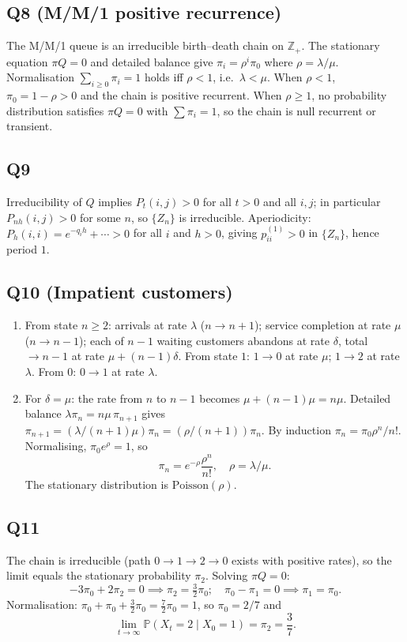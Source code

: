 \documentclass[11pt]{article}
\newcommand{\PP}{\mathbb{P}}
\newcommand{\1}{\mathbf{1}}
\begin{document}
\subsection*{Q8 (M/M/1 positive recurrence)}
The M/M/1 queue is an irreducible birth--death chain on $\mathbb{Z}_+$.  The stationary equation $\pi Q=0$ and detailed balance give $\pi_i=\rho^i\pi_0$ where $\rho=\lambda/\mu$.  Normalisation $\sum_{i\ge0}\pi_i=1$ holds iff $\rho<1$, i.e.\ $\lambda<\mu$.  When $\rho<1$, $\pi_0=1-\rho>0$ and the chain is positive recurrent.  When $\rho\ge1$, no probability distribution satisfies $\pi Q=0$ with $\sum\pi_i=1$, so the chain is null recurrent or transient.

\subsection*{Q9}
Irreducibility of $Q$ implies $P_t(i,j)>0$ for all $t>0$ and all $i,j$; in particular $P_{nh}(i,j)>0$ for some $n$, so $\{Z_n\}$ is irreducible.  Aperiodicity: $P_h(i,i)=e^{-q_i h}+\cdots>0$ for all $i$ and $h>0$, giving $p^{(1)}_{ii}>0$ in $\{Z_n\}$, hence period $1$.

\subsection*{Q10 (Impatient customers)}
\begin{enumerate}[label=(\alph*)]
\item From state $n\ge2$: arrivals at rate $\lambda$ ($n\to n+1$); service completion at rate $\mu$ ($n\to n-1$); each of $n-1$ waiting customers abandons at rate $\delta$, total $\to n-1$ at rate $\mu+(n-1)\delta$.  From state $1$: $1\to0$ at rate $\mu$; $1\to2$ at rate $\lambda$.  From $0$: $0\to1$ at rate $\lambda$.
\item For $\delta=\mu$: the rate from $n$ to $n-1$ becomes $\mu+(n-1)\mu=n\mu$.  Detailed balance $\lambda\pi_n=n\mu\,\pi_{n+1}$ gives $\pi_{n+1}=(\lambda/(n+1)\mu)\pi_n=(\rho/(n+1))\pi_n$.  By induction $\pi_n=\pi_0\rho^n/n!$.  Normalising, $\pi_0 e^{\rho}=1$, so
\[
\pi_n=e^{-\rho}\frac{\rho^n}{n!},\quad\rho=\lambda/\mu.
\]
The stationary distribution is $\mathrm{Poisson}(\rho)$.
\end{enumerate}

\subsection*{Q11}
The chain is irreducible (path $0\to1\to2\to0$ exists with positive rates), so the limit equals the stationary probability $\pi_2$.  Solving $\pi Q=0$:
\[
-3\pi_0+2\pi_2=0\implies\pi_2=\tfrac{3}{2}\pi_0;\quad
\pi_0-\pi_1=0\implies\pi_1=\pi_0.
\]
Normalisation: $\pi_0+\pi_0+\tfrac{3}{2}\pi_0=\tfrac{7}{2}\pi_0=1$, so $\pi_0=2/7$ and
\[
\lim_{t\to\infty}\PP(X_t=2\mid X_0=1)=\pi_2=\frac{3}{7}.
\]
\end{document}
